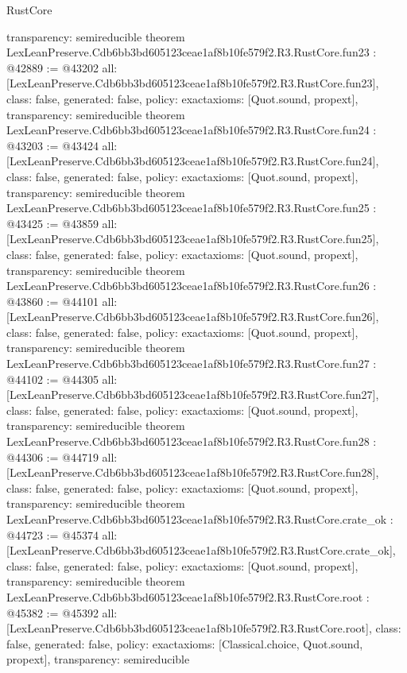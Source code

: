 \begin{lexlean}{RustCore}
\begin{coremodule}
{  transparency: semireducible
}
theorem LexLeanPreserve.Cdb6bb3bd605123ceae1af8b10fe579f2.R3.RustCore.fun23 : @42889 := @43202 {
  all: [LexLeanPreserve.Cdb6bb3bd605123ceae1af8b10fe579f2.R3.RustCore.fun23],
  class: false,
  generated: false,
  policy: exact{axioms: [Quot.sound, propext]},
  transparency: semireducible
}
theorem LexLeanPreserve.Cdb6bb3bd605123ceae1af8b10fe579f2.R3.RustCore.fun24 : @43203 := @43424 {
  all: [LexLeanPreserve.Cdb6bb3bd605123ceae1af8b10fe579f2.R3.RustCore.fun24],
  class: false,
  generated: false,
  policy: exact{axioms: [Quot.sound, propext]},
  transparency: semireducible
}
theorem LexLeanPreserve.Cdb6bb3bd605123ceae1af8b10fe579f2.R3.RustCore.fun25 : @43425 := @43859 {
  all: [LexLeanPreserve.Cdb6bb3bd605123ceae1af8b10fe579f2.R3.RustCore.fun25],
  class: false,
  generated: false,
  policy: exact{axioms: [Quot.sound, propext]},
  transparency: semireducible
}
theorem LexLeanPreserve.Cdb6bb3bd605123ceae1af8b10fe579f2.R3.RustCore.fun26 : @43860 := @44101 {
  all: [LexLeanPreserve.Cdb6bb3bd605123ceae1af8b10fe579f2.R3.RustCore.fun26],
  class: false,
  generated: false,
  policy: exact{axioms: [Quot.sound, propext]},
  transparency: semireducible
}
theorem LexLeanPreserve.Cdb6bb3bd605123ceae1af8b10fe579f2.R3.RustCore.fun27 : @44102 := @44305 {
  all: [LexLeanPreserve.Cdb6bb3bd605123ceae1af8b10fe579f2.R3.RustCore.fun27],
  class: false,
  generated: false,
  policy: exact{axioms: [Quot.sound, propext]},
  transparency: semireducible
}
theorem LexLeanPreserve.Cdb6bb3bd605123ceae1af8b10fe579f2.R3.RustCore.fun28 : @44306 := @44719 {
  all: [LexLeanPreserve.Cdb6bb3bd605123ceae1af8b10fe579f2.R3.RustCore.fun28],
  class: false,
  generated: false,
  policy: exact{axioms: [Quot.sound, propext]},
  transparency: semireducible
}
theorem LexLeanPreserve.Cdb6bb3bd605123ceae1af8b10fe579f2.R3.RustCore.crate_ok : @44723 := @45374 {
  all: [LexLeanPreserve.Cdb6bb3bd605123ceae1af8b10fe579f2.R3.RustCore.crate_ok],
  class: false,
  generated: false,
  policy: exact{axioms: [Quot.sound, propext]},
  transparency: semireducible
}
theorem LexLeanPreserve.Cdb6bb3bd605123ceae1af8b10fe579f2.R3.RustCore.root : @45382 := @45392 {
  all: [LexLeanPreserve.Cdb6bb3bd605123ceae1af8b10fe579f2.R3.RustCore.root],
  class: false,
  generated: false,
  policy: exact{axioms: [Classical.choice, Quot.sound, propext]},
  transparency: semireducible
}


\end{coremodule}
\end{lexlean}
